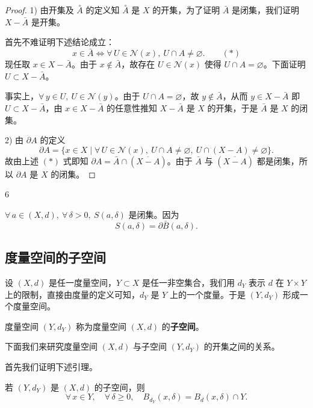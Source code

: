 \begin{proof}

1) 由开集及 $\overset{\circ}{A}$ 的定义知 $\overset{\circ}{A}$ 是 $X$ 的开集，为了证明 $\bar A$ 是闭集，我们证明 $X-\bar A$ 是开集。

首先不难证明下述结论成立：
\[x\in\bar A\Longleftrightarrow\forall\,U\in\mathscr{N}(x),\ U\cap A\neq\varnothing.\qquad(*)\]
现任取 $x\in X-\bar A$。由于 $x\notin\bar A$，故存在 $U\in\mathscr{N}(x)$ 使得 $U\cap A=\varnothing$。下面证明 $U\subset X-\bar A$。

事实上，$\forall\,y\in U,\ U\in\mathscr{N}(y)$。由于 $U\cap A=\varnothing$，故 $y\notin\bar A$，从而 $y\in X-\bar A$ 即 $U\subset X-\bar A$，由 $x\in X-\bar A$ 的任意性推知 $X-\bar A$ 是 $X$ 的开集，于是 $\bar A$ 是 $X$ 的闭集。

2) 由 $\partial A$ 的定义
\[\partial A=\{x\in X\mid\forall\,U\in\mathscr{N}(x),\ U\cap A\neq\varnothing,\ U\cap(X-A)\neq\varnothing\}.\]
故由上述 $(*)$ 式即知 $\partial A=\bar A\cap(\overline{X-A})$。由于 $\bar A$ 与 $(\overline{X-A})$ 都是闭集，所以 $\partial A$ 是 $X$ 的闭集。

\end{proof}

\begin{sourceexample}{6}

$\forall\,a\in(X,d),\ \forall\,\delta>0,\ S(a,\delta)$ 是闭集。因为
\[S(a,\delta)=\partial\bar B(a,\delta).\]

\end{sourceexample}

\subsection{度量空间的子空间}
	\label{sec:10-2-4}

设 $(X,d)$ 是任一度量空间，$Y\subset X$ 是任一非空集合，我们用 $d_Y$ 表示 $d$ 在 $Y\times Y$ 上的限制，直接由度量的定义可知，$d_Y$ 是 $Y$ 上的一个度量。于是 $(Y,d_Y)$ 形成一个度量空间。

\begin{mydef*}{}

度量空间 $(Y,d_Y)$ 称为度量空间 $(X,d)$ 的\textbf{子空间}。

\end{mydef*}

下面我们来研究度量空间 $(X,d)$ 与子空间 $(Y,d_Y)$ 的开集之间的关系。

首先我们证明下述引理。

\begin{mylemma*}{}

若 $(Y,d_Y)$ 是 $(X,d)$ 的子空间，则
\[\forall\,x\in Y,\quad\forall\,\delta\geqslant0,\quad B_{d_Y}(x,\delta)=B_d(x,\delta)\cap Y.\]

\end{mylemma*}

